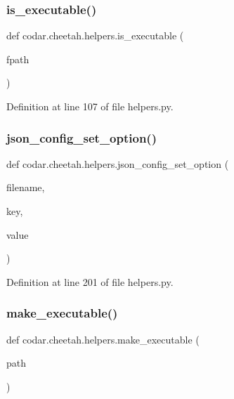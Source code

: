 \subsubsection{\texorpdfstring{is\+\_\+executable()}{is\_executable()}}
{\footnotesize\ttfamily def codar.\+cheetah.\+helpers.\+is\+\_\+executable (\begin{DoxyParamCaption}\item[{}]{fpath }\end{DoxyParamCaption})}



Definition at line 107 of file helpers.\+py.

\mbox{\label{namespacecodar_1_1cheetah_1_1helpers_a21131ccd55ec0fd06dfbc8ecbce83366}} 
\subsubsection{\texorpdfstring{json\+\_\+config\+\_\+set\+\_\+option()}{json\_config\_set\_option()}}
{\footnotesize\ttfamily def codar.\+cheetah.\+helpers.\+json\+\_\+config\+\_\+set\+\_\+option (\begin{DoxyParamCaption}\item[{}]{filename,  }\item[{}]{key,  }\item[{}]{value }\end{DoxyParamCaption})}



Definition at line 201 of file helpers.\+py.

\mbox{\label{namespacecodar_1_1cheetah_1_1helpers_a2e29df35f1fb8df3960ad8a2a0dbb2b9}} 
\subsubsection{\texorpdfstring{make\+\_\+executable()}{make\_executable()}}
{\footnotesize\ttfamily def codar.\+cheetah.\+helpers.\+make\+\_\+executable (\begin{DoxyParamCaption}\item[{}]{path }\end{DoxyParamCaption})}



